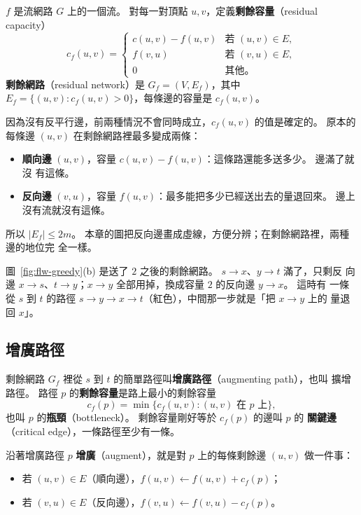 \begin{definition}[剩餘網路]
\label{def:flw-residual}
$f$ 是流網路 $G$ 上的一個流。 對每一對頂點 $u, v$，定義\textbf{剩餘容量}（residual
capacity）
\[
c_f(u, v) =
\begin{cases}
c(u, v) - f(u, v) & \text{若 } (u, v) \in E, \\
f(v, u) & \text{若 } (v, u) \in E, \\
0 & \text{其他。}
\end{cases}
\]
\textbf{剩餘網路}（residual network）是 $G_f = (V, E_f)$，其中
$E_f = \{(u, v) : c_f(u, v) > 0\}$，每條邊的容量是 $c_f(u, v)$。
\end{definition}

因為沒有反平行邊，前兩種情況不會同時成立，$c_f(u, v)$ 的值是確定的。 原本的每條邊
$(u, v)$ 在剩餘網路裡最多變成兩條：
\begin{itemize}
\item \textbf{順向邊} $(u, v)$，容量 $c(u, v) - f(u, v)$：這條路還能多送多少。 邊滿了就沒
有這條。
\item \textbf{反向邊} $(v, u)$，容量 $f(u, v)$：最多能把多少已經送出去的量退回來。 邊上
沒有流就沒有這條。
\end{itemize}
所以 $|E_f| \le 2m$。 本章的圖把反向邊畫成虛線，方便分辨；在剩餘網路裡，兩種邊的地位完
全一樣。

圖~\ref{fig:flw-greedy}(b) 是送了 $2$ 之後的剩餘網路。 $s \to x$、$y \to t$ 滿了，只剩反
向邊 $x \to s$、$t \to y$；$x \to y$ 全部用掉，換成容量 $2$ 的反向邊 $y \to x$。 這時有
一條從 $s$ 到 $t$ 的路徑 $s \to y \to x \to t$（紅色），中間那一步就是「把 $x \to y$ 上的
量退回 $x$」。

\subsection{增廣路徑}

\begin{definition}[增廣路徑]
\label{def:flw-augpath}
剩餘網路 $G_f$ 裡從 $s$ 到 $t$ 的簡單路徑叫\textbf{增廣路徑}（augmenting path），也叫
擴增路徑。 路徑 $p$ 的\textbf{剩餘容量}是路上最小的剩餘容量
\[
c_f(p) = \min\{c_f(u, v) : (u, v) \text{ 在 } p \text{ 上}\},
\]
也叫 $p$ 的\textbf{瓶頸}（bottleneck）。 剩餘容量剛好等於 $c_f(p)$ 的邊叫 $p$ 的
\textbf{關鍵邊}（critical edge），一條路徑至少有一條。
\end{definition}

沿著增廣路徑 $p$ \textbf{增廣}（augment），就是對 $p$ 上的每條剩餘邊 $(u, v)$ 做一件事：
\begin{itemize}
\item 若 $(u, v) \in E$（順向邊），$f(u, v) \gets f(u, v) + c_f(p)$；
\item 若 $(v, u) \in E$（反向邊），$f(v, u) \gets f(v, u) - c_f(p)$。
\end{itemize}

